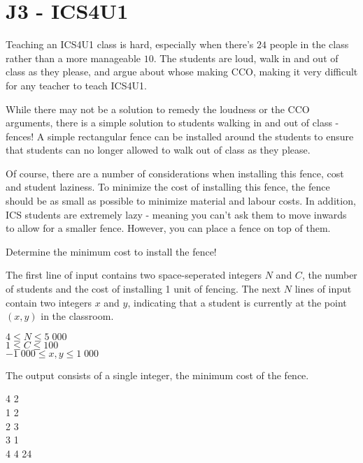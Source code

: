 \section*{J3 - ICS4U1}
Teaching an ICS4U1 class is hard, especially when there's $24$ people in the class rather than a more manageable $10$. The students are loud, walk in and out of class as they please, and argue about whose making CCO, making it very difficult for any teacher to teach ICS4U1.

While there may not be a solution to remedy the loudness or the CCO arguments, there is a simple solution to students walking in and out of class - fences! A simple rectangular fence can be installed around the students to ensure that students can no longer allowed to walk out of class as they please.

Of course, there are a number of considerations when installing this fence, cost and student laziness. To minimize the cost of installing this fence, the fence should be as small as possible to minimize material and labour costs. In addition, ICS students are extremely lazy - meaning you can't ask them to move inwards to allow for a smaller fence. However, you can place a fence on top of them.

Determine the minimum cost to install the fence!

The first line of input contains two space-seperated integers $N$ and $C$, the number of students and the cost of installing 1 unit of fencing. The next $N$ lines of input contain two integers $x$ and $y$, indicating that a student is currently at the point $(x, y)$ in the classroom.

\constraints
$4 \leq N \leq 5\;000$ \\
$1 \leq C \leq 100$ \\
$-1\;000 \leq x, y \leq 1\;000$

\outputformat
The output consists of a single integer, the minimum cost of the fence.

\addsample
{
    4 2 \\
    1 2 \\
    2 3 \\
    3 1 \\
    4 4
}
{
    24
}